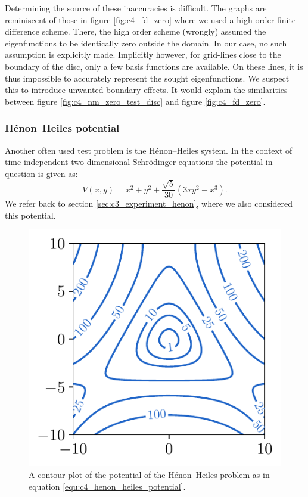 Determining the source of these inaccuracies is difficult. The graphs are reminiscent of those in figure \ref{fig:c4_fd_zero} where we used a high order finite difference scheme. There, the high order scheme (wrongly) assumed the eigenfunctions to be identically zero outside the domain. In our case, no such assumption is explicitly made. Implicitly however, for grid-lines close to the boundary of the disc, only a few basis functions are available. On these lines, it is thus impossible to accurately represent the sought eigenfunctions. We suspect this to introduce unwanted boundary effects. It would explain the similarities between figure \ref{fig:c4_nm_zero_test_disc} and figure \ref{fig:c4_fd_zero}.


\subsubsection{Hénon--Heiles potential}\label{sec:c4_numerical_henon_heiles}

Another often used test problem is the Hénon--Heiles system. In the context of time-independent two-dimensional Schrödinger equations the potential in question is given as:
\begin{equation}\label{equ:c4_henon_heiles_potential}
    V(x, y) = x^2 + y^2 + \frac{\sqrt{5}}{30}(3 x y^2 - x^3)\text{.}
\end{equation}
We refer back to section \ref{sec:c3_experiment_henon}, where we also considered this potential.

\begin{figure}
    \begin{minipage}[b]{.5\textwidth}
        \includegraphics[width=\textwidth]{img/chapter4/henon_contour.pdf}
    \end{minipage}
    \hfill
    \begin{minipage}[b]{.49\textwidth}
        \caption{A contour plot of the potential of the Hénon--Heiles problem as in equation \eqref{equ:c4_henon_heiles_potential}.}
        \label{fig:c4_henon_contour}
    \end{minipage}
\end{figure}

